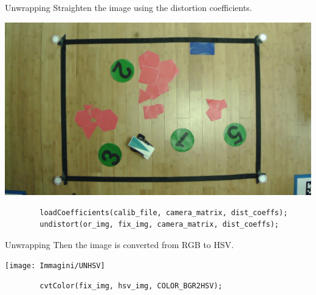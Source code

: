 \begin{frame}[fragile]{Unwrapping}
	Straighten the image using the distortion coefficients. 
	\begin{center}
		\includegraphics[scale=0.15]{Immagini/UNUndistort}	
	\end{center}
	\begin{verbatim}
		loadCoefficients(calib_file, camera_matrix, dist_coeffs);
		undistort(or_img, fix_img, camera_matrix, dist_coeffs);
	\end{verbatim}
\end{frame}

\begin{frame}[fragile]{Unwrapping}
	Then the image is converted from RGB to HSV.
	\begin{center}
		\texttt{[image: Immagini/UNHSV]}
	\end{center}
	\vfill
	\begin{verbatim}
		cvtColor(fix_img, hsv_img, COLOR_BGR2HSV);
	\end{verbatim}
	\vfill
\end{frame}

